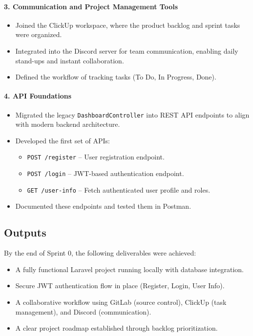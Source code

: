 \paragraph{3. Communication and Project Management Tools}
\begin{itemize}
    \item Joined the ClickUp workspace, where the product backlog and sprint tasks were organized.
    \item Integrated into the Discord server for team communication, enabling daily stand-ups and instant collaboration.
    \item Defined the workflow of tracking tasks (To Do, In Progress, Done).
\end{itemize}

\paragraph{4. API Foundations}
\begin{itemize}
    \item Migrated the legacy \texttt{DashboardController} into REST API endpoints to align with modern backend architecture.
    \item Developed the first set of APIs:
    \begin{itemize}
        \item \texttt{POST /register} – User registration endpoint.
        \item \texttt{POST /login} – JWT-based authentication endpoint.
        \item \texttt{GET /user-info} – Fetch authenticated user profile and roles.
    \end{itemize}
    \item Documented these endpoints and tested them in Postman.
\end{itemize}

\subsection{Outputs}
By the end of Sprint 0, the following deliverables were achieved:
\begin{itemize}
    \item A fully functional Laravel project running locally with database integration.
    \item Secure JWT authentication flow in place (Register, Login, User Info).
    \item A collaborative workflow using GitLab (source control), ClickUp (task management), and Discord (communication).
    \item A clear project roadmap established through backlog prioritization.
\end{itemize}

